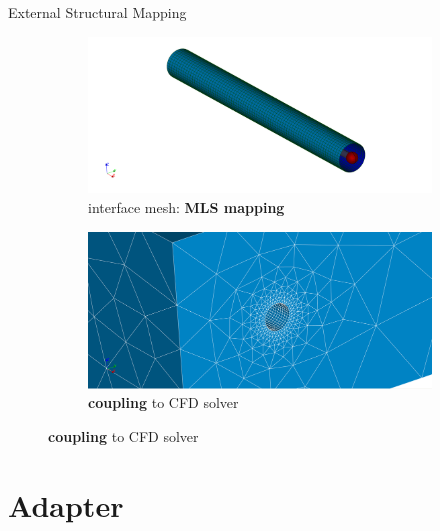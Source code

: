 \documentclass[10pt,t]{beamer}
\begin{document}
\begin{frame}{External Structural Mapping}
\begin{figure}
  \begin{subfigure}[t]{.486\textwidth}
    \centering
    \includegraphics[width=\linewidth]{images/mesh_1b.png}
    \caption{interface mesh: \textbf{MLS mapping}}
  \end{subfigure}
  \hfill
  \begin{subfigure}[t]{.486\textwidth}
    \centering
    \includegraphics[width=\linewidth]{images/whole_1aa.png}
    \caption{\textbf{coupling} to CFD solver}
  \end{subfigure}
\end{figure}


\end{frame}



\section{Adapter}
\end{document}
